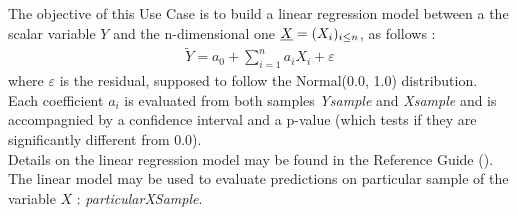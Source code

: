 \renewcommand{\filename}{docUC_InputWithData_LinearModel.tex}
\renewcommand{\filetitle}{UC : Estimation and validation of a linear model from two samples}

\HeaderIIILevel






The objective of this Use Case is to build a linear regression model between a the scalar variable $Y$ and the n-dimensional one ${\underline{X}} = (X_i)_{i \leq n}$, as follows :
\begin{align*}
  \tilde{Y} = a_0 + \sum_{i=1}^n a_i X_i + \varepsilon
\end{align*}
where $\varepsilon$ is the residual, supposed to follow the Normal(0.0, 1.0) distribution.\\
Each coefficient $a_i$ is evaluated from both samples {\itshape Ysample} and {\itshape Xsample} and is accompagnied by a confidence interval and a p-value (which tests if they are significantly different from 0.0).\\




Details on the linear regression model  may be found in the Reference Guide ().\\



The linear model may be used to evaluate predictions on particular sample of the variable $X$ :  {\itshape particularXSample}.\\

